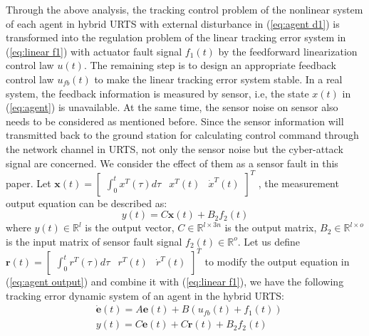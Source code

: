 \documentclass{ieeeaccess}
\begin{document}
Through the above analysis, the tracking control problem of the nonlinear system of each agent in hybrid URTS with external disturbance in (\ref{eq:agent d1}) is transformed into the regulation problem of the linear tracking error system in (\ref{eq:linear f1}) with actuator fault signal $f_1(t)$ by the feedforward linearization control law $u(t)$. The remaining step is to design an appropriate feedback control law $u_{fb}(t)$ to make the linear tracking error system stable. In a real system, the feedback information is measured by sensor, i.e, the state $x(t)$ in (\ref{eq:agent}) is unavailable. At the same time, the sensor noise on sensor also needs to be considered as mentioned before. Since the sensor information will transmitted back to the ground station for calculating control command through the network channel in URTS, not only the sensor noise but the cyber-attack signal are concerned. We consider the effect of them as a sensor fault in this paper. Let $\pmb{x}(t)=\begin{bmatrix}
    \int_{0}^{t}x^T(\tau)d\tau & x^T(t) & \dot{x}^T(t)
\end{bmatrix}^T$
, the measurement output equation can be described as:
\begin{equation} \label{eq:agent output}
    y(t) = C\pmb{x}(t) + B_2f_2(t)
\end{equation}
where $y(t)\in\mathbb{R}^{l}$ is the output vector, $C\in\mathbb{R}^{l\times 3n}$ is the output matrix, $B_2\in\mathbb{R}^{l\times o}$ is the input matrix of sensor fault signal $f_2(t)\in\mathbb{R}^o$. Let us define $\pmb{r}(t)=\begin{bmatrix}
    \int_{0}^{t}r^T(\tau)d\tau & r^T(t) & \dot{r}^T(t)
\end{bmatrix}^T$ to modify the output equation in (\ref{eq:agent output}) and combine it with (\ref{eq:linear f1}), we have the following tracking error dynamic system of an agent in the hybrid URTS:
\begin{equation} \label{eq:error}
    \begin{split}
        & \dot{\pmb{e}}(t)=A\pmb{e}(t)+B(u_{fb}(t)+f_1(t)) \\
        & y(t) = C\pmb{e}(t) + C\pmb{r}(t) + B_2f_2(t)   
    \end{split}  
\end{equation}
\end{document}
